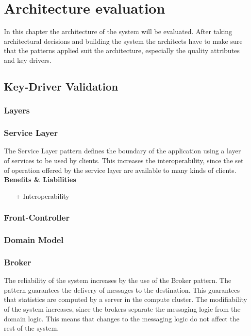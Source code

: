 
\newcommand{\bo}[1]{\textbf{#1}}

\chapter{Architecture evaluation}
\label{ch:evaluation}

In this chapter the architecture of the system will be evaluated. After taking architectural decisions and building the system the architects have to make sure that the patterns applied suit the architecture, especially the quality attributes and key drivers.%

\section{Key-Driver Validation}

\subsection*{Layers}
\subsection*{Service Layer}
The Service Layer pattern defines the boundary of the application using a layer of services to be used by clients. This increases the interoperability, since the set of operation offered by the service layer are available to many kinds of clients. \\
\textbf{Benefits \& Liabilities} ~
\begin{itemize}
\item[+] Interoperability 
\end{itemize}

\subsection*{Front-Controller}
\subsection*{Domain Model}
\subsection*{Broker}
The reliability of the system increases by the use of the Broker pattern. The pattern guarantees the delivery of messages to the destination. This guarantees that statistics are computed by a server in the compute cluster.
The modifiability of the system increases, since the brokers separate the messaging logic from the domain logic. This means that changes to the messaging logic do not affect the rest of the system.

